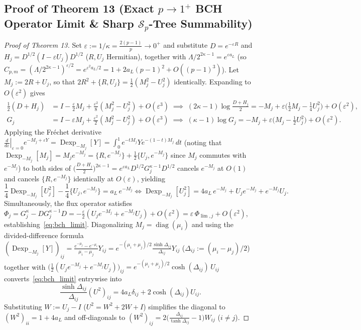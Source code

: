 \documentclass[10pt,letterpaper]{article}
\newcommand{\Sp}{\mathcal{S}_p}
\newcommand{\diag}{\operatorname{diag}}
\begin{document}
\subsection{Proof of Theorem 13 (Exact $p \to 1^+$ BCH Operator Limit \& Sharp $\Sp$-Tree Summability)}

\begin{proof}[Proof of Theorem 13]
Set $\varepsilon := 1/\kappa = \frac{2(p-1)}{p} \to 0^+$ and substitute $D = e^{-\varepsilon R}$ and $H_j = D^{1/2}(I - \varepsilon U_j)D^{1/2}$ ($R, U_j$ Hermitian), together with $\Lambda / 2^{2\kappa - 1} = e^{\varepsilon a_L}$ (so $C_{p,m} = (\Lambda / 2^{2\kappa-1})^{\varepsilon/2} = e^{\varepsilon^2 a_L / 2} = 1 + 2a_L(p-1)^2 + O((p-1)^3)$). Let $M_j := 2R + U_j$, so that $2R^2 + \{R, U_j\} = \frac{1}{2}(M_j^2 - U_j^2)$ identically. Expanding to $O(\varepsilon^2)$ gives
\begin{align*}
  \tfrac{1}{2}(D + H_j) &= I - \tfrac{\varepsilon}{2} M_j + \tfrac{\varepsilon^2}{8}(M_j^2 - U_j^2) + O(\varepsilon^3)
  \;\implies\; (2\kappa - 1)\log\tfrac{D + H_j}{2} = -M_j + \varepsilon\bigl(\tfrac{1}{2}M_j - \tfrac{1}{4}U_j^2\bigr) + O(\varepsilon^2), \\
  G_j &= I - \varepsilon M_j + \tfrac{\varepsilon^2}{2}(M_j^2 - U_j^2) + O(\varepsilon^3)
  \;\implies\; (\kappa - 1)\log G_j = -M_j + \varepsilon\bigl(M_j - \tfrac{1}{2}U_j^2\bigr) + O(\varepsilon^2).
\end{align*}
Applying the Fr\'echet derivative $\left.\frac{d}{d\varepsilon}\right|_{\varepsilon=0} e^{-M_j + \varepsilon Y} = \operatorname{Dexp}_{-M_j}[Y] = \int_0^1 e^{-tM_j} Y e^{-(1-t)M_j}\,dt$ (noting that $\operatorname{Dexp}_{-M_j}[M_j] = M_j e^{-M_j} = \{R, e^{-M_j}\} + \frac{1}{2}\{U_j, e^{-M_j}\}$ since $M_j$ commutes with $e^{-M_j}$) to both sides of $\bigl(\frac{D+H_j}{2}\bigr)^{2\kappa-1} = e^{\varepsilon a_L} D^{1/2} G_j^{\kappa-1} D^{1/2}$ cancels $e^{-M_j}$ at $O(1)$ and cancels $\{R, e^{-M_j}\}$ identically at $O(\varepsilon)$, yielding
\[
  \frac{1}{4}\operatorname{Dexp}_{-M_j}[U_j^2] - \frac{1}{4}\{U_j, e^{-M_j}\} = a_L\, e^{-M_j}
  \iff \operatorname{Dexp}_{-M_j}[U_j^2] = 4a_L\, e^{-M_j} + U_j e^{-M_j} + e^{-M_j} U_j.
\]
Simultaneously, the flux operator satisfies $\Phi_j = G_j^\kappa - D G_j^{\kappa-1} D = -\frac{\varepsilon}{2}(U_j e^{-M_j} + e^{-M_j} U_j) + O(\varepsilon^2) = \varepsilon\,\Phi_{\lim,j} + O(\varepsilon^2)$, establishing~\eqref{eq:bch_limit}. Diagonalizing $M_j = \diag(\mu_i)$ and using the divided-difference formula $(\operatorname{Dexp}_{-M_j}[Y])_{ij} = \frac{e^{-\mu_j} - e^{-\mu_i}}{\mu_i - \mu_j} Y_{ij} = e^{-(\mu_i+\mu_j)/2}\frac{\sinh\Delta_{ij}}{\Delta_{ij}} Y_{ij}$ ($\Delta_{ij} := (\mu_i - \mu_j)/2$) together with $\bigl(\frac{1}{2}(U_j e^{-M_j} + e^{-M_j} U_j)\bigr)_{ij} = e^{-(\mu_i+\mu_j)/2}\cosh(\Delta_{ij})\, U_{ij}$ converts~\eqref{eq:bch_limit} entrywise into
\[
  \frac{\sinh\Delta_{ij}}{\Delta_{ij}}(U^2)_{ij} = 4a_L \delta_{ij} + 2\cosh(\Delta_{ij}) U_{ij}.
\]
Substituting $W := U_j - I$ ($U^2 = W^2 + 2W + I$) simplifies the diagonal to $(W^2)_{ii} = 1 + 4a_L$ and off-diagonals to $(W^2)_{ij} = 2\bigl(\frac{\Delta_{ij}}{\tanh\Delta_{ij}} - 1\bigr)W_{ij}$ ($i \neq j$).


\end{proof}
\end{document}
